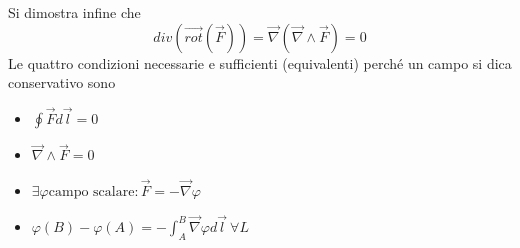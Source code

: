 \documentclass[10pt,a4paper]{article}
\begin{document}
Si dimostra infine che 
\[div(\vec{rot}(\vec{F})) =\vec{\nabla}(\vec{\nabla}\wedge\vec{F})=0\]
Le quattro condizioni necessarie e sufficienti (equivalenti) perché un campo si dica conservativo sono
\begin{itemize}
	\item \(\oint \vec{F}d\vec{l} = 0 \)
	\item \(\vec{\nabla}\wedge\vec{F} = 0\)
	\item \(\exists\varphi \text{campo scalare} : \vec{F}=-\vec{\nabla}\varphi\)
	\item \(\varphi(B)-\varphi(A) = -\int_{A}^{B}\vec{\nabla}\varphi d\vec{l}\ \forall L\)
\end{itemize}
\end{document}
